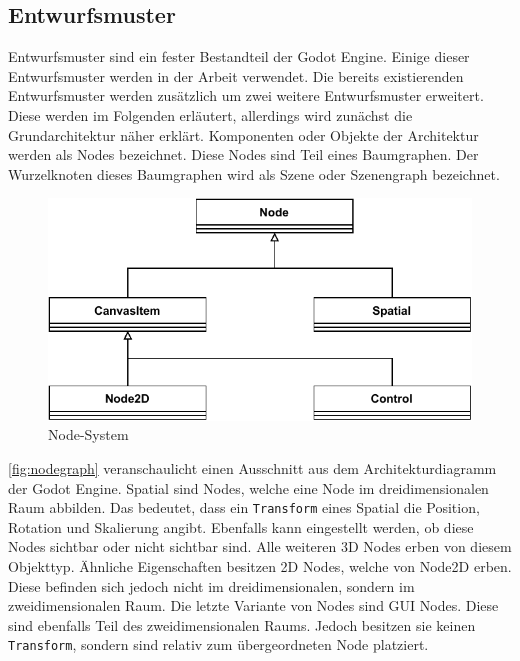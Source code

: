 \subsection{Entwurfsmuster}
Entwurfsmuster sind ein fester Bestandteil der Godot Engine. Einige dieser Entwurfsmuster werden in der Arbeit verwendet. Die bereits existierenden Entwurfsmuster werden zusätzlich um zwei weitere Entwurfsmuster erweitert. Diese werden im Folgenden erläutert, allerdings wird zunächst die Grundarchitektur näher erklärt. Komponenten oder Objekte der Architektur werden als Nodes bezeichnet. Diese Nodes sind Teil eines Baumgraphen. Der Wurzelknoten dieses Baumgraphen wird als Szene oder Szenengraph bezeichnet.\\

\begin{figure}[ht]
\centering
\includegraphics[width=0.8\columnwidth]{figures/node-graph.pdf}
\caption{\label{fig:nodegraph} Node-System}
\end{figure}

\autoref{fig:nodegraph} veranschaulicht einen Ausschnitt aus dem Architekturdiagramm der Godot Engine\cite{godot-architecture}. Spatial sind Nodes, welche eine Node im dreidimensionalen Raum abbilden. Das bedeutet, dass ein \texttt{Transform} eines Spatial die Position, Rotation und Skalierung angibt. Ebenfalls kann eingestellt werden, ob diese Nodes sichtbar oder nicht sichtbar sind. Alle weiteren 3D Nodes erben von diesem Objekttyp. Ähnliche Eigenschaften besitzen {2D Nodes}, welche von Node2D erben. Diese befinden sich jedoch nicht im dreidimensionalen, sondern im zweidimensionalen Raum. Die letzte Variante von Nodes sind \ac{GUI} Nodes. Diese sind ebenfalls Teil des zweidimensionalen Raums. Jedoch besitzen sie keinen \texttt{Transform}, sondern sind relativ zum übergeordneten Node platziert.\\

